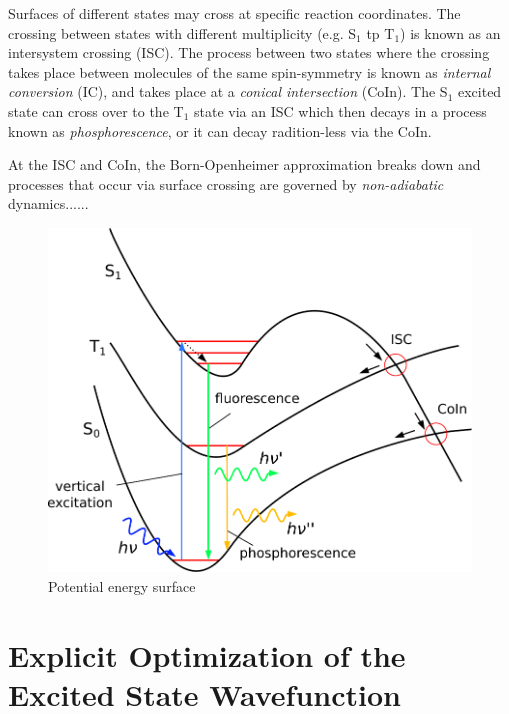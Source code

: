 Surfaces of different states may cross at specific reaction coordinates. The crossing between states with different multiplicity (e.g. S$_1$ tp T$_1$) is known as an intersystem crossing (ISC). The process between two states where the crossing takes place between molecules of the same spin-symmetry is known as \emph{internal conversion} (IC), and takes place at a \emph{conical intersection} (CoIn). The S$_1$ excited state can cross over to the T$_1$ state via an ISC which then decays in a process known as \emph{phosphorescence}, or it can decay radition-less via the CoIn. 

At the ISC and CoIn, the Born-Openheimer approximation breaks down and processes that occur via surface crossing are governed by \emph{non-adiabatic} dynamics...... 

\begin{figure}
\centering
\includegraphics[scale=0.8]{Pics/PESEX}
\caption{Potential energy surface}
\label{fig:PESEX}
\end{figure}

\section{Explicit Optimization of the Excited State Wavefunction}

